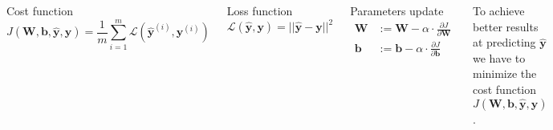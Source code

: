 \begin{frame}
    \begin{columns}
        \begin{block}{Cost function}
            $$
            J(\bm{W}, \bm{b}, \hat{\bm{y}}, \bm{y}) = 
            \frac{1}{m} \sum_{i=1}^{m} \mathcal{L}(\hat{\bm{y}}^{(i)}, \bm{y}^{(i)})
            $$
        \end{block}
        \begin{block}{Loss function}
            $$
            \mathcal{L}(\hat{\bm{y}}, \bm{y}) = ||\hat{\bm{y}} - \bm{y}||^2
            $$
        \end{block}
        \begin{block}{Parameters update}
            \begin{align*}
            \bm{W} &:= \bm{W} - \alpha \cdot \frac{\partial J}{\partial \bm{W}} \\
            \bm{b} &:= \bm{b} - \alpha \cdot \frac{\partial J}{\partial \bm{b}}
            \end{align*}
        \end{block}
        To achieve better results at predicting $\hat{\bm{y}}$ 
        we have to minimize the cost function $J(\bm{W}, \bm{b}, \hat{\bm{y}}, \bm{y})$.
    \end{columns}
\end{frame}

